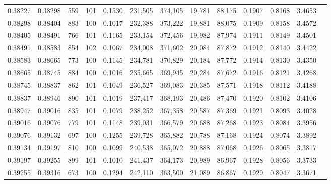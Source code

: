 \begin{tabular}{rrrrrrrrrrrrr}
0.38227 & 0.38298 &   559 & 101 &                                     0.1530 & 231,505 & 374,105 &  19,781 &  88,175 & 0.1907 & 0.8168 & 3.4653 \\
0.38298 & 0.38404 &   883 & 100 &                                     0.1017 & 232,388 & 373,222 &  19,881 &  88,075 & 0.1909 & 0.8158 & 3.4572 \\
0.38405 & 0.38491 &   766 & 101 &                                     0.1165 & 233,154 & 372,456 &  19,982 &  87,974 & 0.1911 & 0.8149 & 3.4501 \\
0.38491 & 0.38583 &   854 & 102 &                                     0.1067 & 234,008 & 371,602 &  20,084 &  87,872 & 0.1912 & 0.8140 & 3.4422 \\
0.38583 & 0.38665 &   773 & 100 &                                     0.1145 & 234,781 & 370,829 &  20,184 &  87,772 & 0.1914 & 0.8130 & 3.4350 \\
0.38665 & 0.38745 &   884 & 100 &                                     0.1016 & 235,665 & 369,945 &  20,284 &  87,672 & 0.1916 & 0.8121 & 3.4268 \\
0.38745 & 0.38837 &   862 & 101 &                                     0.1049 & 236,527 & 369,083 &  20,385 &  87,571 & 0.1918 & 0.8112 & 3.4188 \\
0.38837 & 0.38946 &   890 & 101 &                                     0.1019 & 237,417 & 368,193 &  20,486 &  87,470 & 0.1920 & 0.8102 & 3.4106 \\
0.38947 & 0.39016 &   835 & 101 &                                     0.1079 & 238,252 & 367,358 &  20,587 &  87,369 & 0.1921 & 0.8093 & 3.4028 \\
0.39016 & 0.39076 &   779 & 101 &                                     0.1148 & 239,031 & 366,579 &  20,688 &  87,268 & 0.1923 & 0.8084 & 3.3956 \\
0.39076 & 0.39132 &   697 & 100 &                                     0.1255 & 239,728 & 365,882 &  20,788 &  87,168 & 0.1924 & 0.8074 & 3.3892 \\
0.39134 & 0.39197 &   810 & 100 &                                     0.1099 & 240,538 & 365,072 &  20,888 &  87,068 & 0.1926 & 0.8065 & 3.3817 \\
0.39197 & 0.39255 &   899 & 101 &                                     0.1010 & 241,437 & 364,173 &  20,989 &  86,967 & 0.1928 & 0.8056 & 3.3733 \\
0.39255 & 0.39316 &   673 & 100 &                                     0.1294 & 242,110 & 363,500 &  21,089 &  86,867 & 0.1929 & 0.8047 & 3.3671 \\

\end{tabular}
